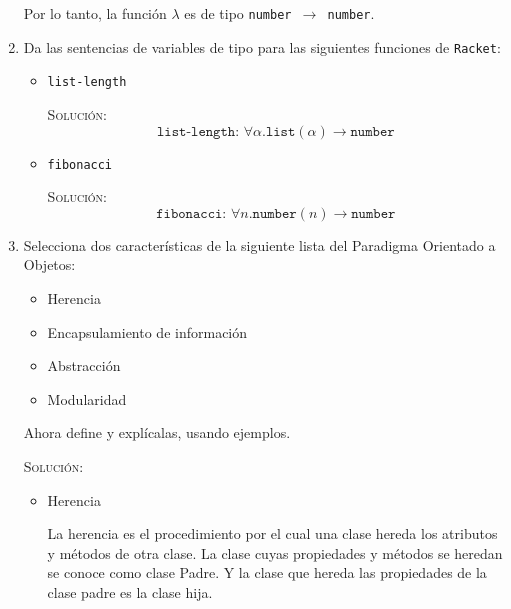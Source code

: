 \documentclass[letterpaper,11pt]{article}
\begin{document}
\begin{enumerate}
    Por lo tanto, la función $\lambda$ es de tipo \texttt{number 
    $\rightarrow$ number}.

    \item Da las sentencias de variables de tipo para las siguientes funciones 
    de \texttt{Racket}:
    \begin{itemize}
        \item \texttt{list-length}

        \textsc{Solución:}
        \begin{equation*}
            \texttt{list-length: }\forall \alpha. \texttt{list}(\alpha) 
        \rightarrow \texttt{number}
        \end{equation*}

        \item \texttt{fibonacci}
        
        \textsc{Solución:} 
        \begin{equation*}
            \texttt{fibonacci: } \forall n. \texttt{number}(n) \rightarrow 
            \texttt{number}
        \end{equation*}
    \end{itemize}

    \item Selecciona dos características de la siguiente lista del Paradigma 
    Orientado a Objetos:
    \begin{itemize}
        \item Herencia
        \item Encapsulamiento de información
        \item Abstracción
        \item Modularidad
    \end{itemize}

    Ahora define y explícalas, usando ejemplos.

    \textsc{Solución:}
    \begin{itemize}
        \item Herencia

        La herencia es el procedimiento por el cual una clase hereda los 
        atributos y métodos de otra clase. La clase cuyas propiedades y métodos 
        se heredan se conoce como clase Padre. Y la clase que hereda las 
        propiedades de la clase padre es la clase hija.


\end{itemize}
\end{enumerate}
\end{document}
